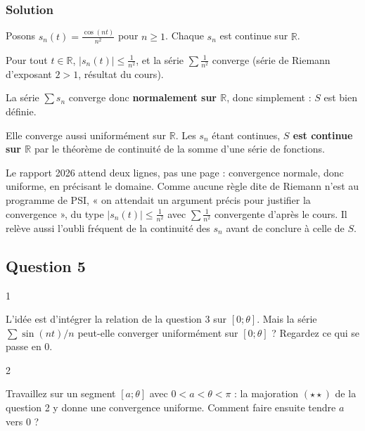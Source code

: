 \documentclass[11pt,a4paper]{article}
\begin{document}
\hypertarget{solution-3}{%
\subsubsection{Solution}\label{solution-3}}

Posons \(s_n(t)=\frac{\cos(nt)}{n^2}\) pour \(n\ge1\). Chaque \(s_n\) est continue sur \(\mathbb{R}\).

Pour tout \(t\in\mathbb{R}\), \(|s_n(t)|\le\frac1{n^2}\), et la série \(\sum\frac1{n^2}\) converge (série de Riemann d'exposant \(2>1\), résultat du cours).

La série \(\sum s_n\) converge donc \textbf{normalement sur \(\mathbb{R}\)}, donc simplement : \(S\) est bien définie.

Elle converge aussi uniformément sur \(\mathbb{R}\). Les \(s_n\) étant continues, \textbf{\(S\) est continue sur \(\mathbb{R}\)} par le théorème de continuité de la somme d'une série de fonctions.

\begin{jury}

Le rapport 2026 attend deux lignes, pas une page : convergence normale, donc uniforme, en précisant le domaine. Comme aucune règle dite de Riemann n'est au programme de PSI, « on attendait un argument précis pour justifier la convergence », du type \(|s_n(t)|\le\frac1{n^2}\) avec \(\sum\frac1{n^2}\) convergente d'après le cours. Il relève aussi l'oubli fréquent de la continuité des \(s_n\) avant de conclure à celle de \(S\).

\end{jury}

\hypertarget{question-5}{%
\subsection{Question 5}\label{question-5}}

\begin{indication}{1}

L'idée est d'intégrer la relation de la question 3 sur \([0;\theta]\). Mais la série \(\sum\sin(nt)/n\) peut-elle converger uniformément sur \([0;\theta]\) ? Regardez ce qui se passe en \(0\).

\end{indication}

\begin{indication}{2}

Travaillez sur un segment \([a;\theta]\) avec \(0<a<\theta<\pi\) : la majoration \((\star\star)\) de la question 2 y donne une convergence uniforme. Comment faire ensuite tendre \(a\) vers \(0\) ?

\end{indication}
\end{document}
